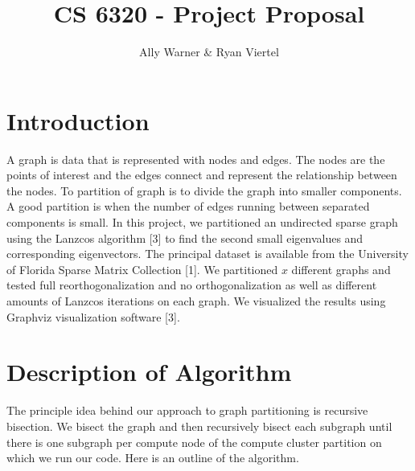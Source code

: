 \documentclass[11pt, oneside]{article}   	%
\title{CS 6320 - Project Proposal}
\author{Ally Warner \& Ryan Viertel}
\begin{document}
\maketitle

\section{Introduction}
A graph is data that is represented with nodes and edges. The nodes are the points of interest and the edges connect and represent the relationship between the nodes. To partition of graph is to divide the graph into smaller components. A good partition is when the number of edges running between separated components is small. In this project, we partitioned an undirected sparse graph using the Lanzcos algorithm [3] to find the second small eigenvalues and corresponding eigenvectors.  The principal dataset is available from the University of Florida Sparse Matrix Collection [1]. We partitioned $x$ different graphs and tested full reorthogonalization and no orthogonalization as well as different amounts of Lanzcos iterations on each graph. We visualized the results using Graphviz visualization software [3].

\section{Description of Algorithm}
The principle idea behind our approach to graph partitioning is recursive bisection. We bisect the graph and then recursively bisect each subgraph until there is one subgraph per compute node of the compute cluster partition on which we run our code. Here is an outline of the algorithm.
\end{document}
